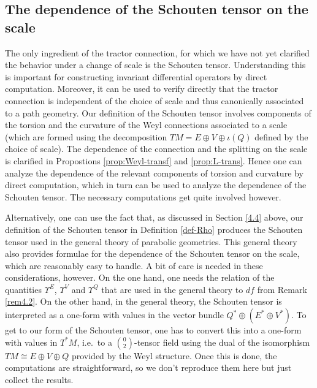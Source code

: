 \documentclass[11pt]{amsart}
\numberwithin{proposition}{section}
\numberwithin{equation}{section}
\begin{document}
\subsection{The dependence of the Schouten tensor on the scale}\label{4.6}
The only ingredient of the tractor connection, for which we have not yet clarified the behavior under a change of scale is the Schouten tensor. Understanding this is important for constructing invariant differential operators by direct computation. Moreover, it can be used to verify directly that the tractor connection is independent of the choice of scale and thus canonically associated to a path geometry. Our definition of the Schouten tensor involves components of the torsion and the curvature of the Weyl connections associated to a scale (which are formed using the decomposition $TM=E\oplus V\oplus\iota(Q)$ defined by the choice of scale). The dependence of the connection and the splitting on the scale is clarified in Propostions \ref{prop:Weyl-transf} and \ref{prop:L-trans}. Hence one can analyze the dependence of the relevant components of torsion and curvature by direct computation, which in turn can be used to analyze the dependence of the Schouten tensor. The necessary computations get quite involved however. 

Alternatively, one can use the fact that, as discussed in Section \ref{4.4} above, our definition of the Schouten tensor in Definition \ref{def-Rho} produces the Schouten tensor used in the general theory of parabolic geometries. This general theory also provides formulae for the dependence of the Schouten tensor on the scale, which are reasonably easy to handle. A bit of care is needed in these considerations, however. On the one hand, one needs the relation of the quantities $\Upsilon^E$, $\Upsilon^V$ and $\Upsilon^Q$ that are used in the general theory to $df$ from Remark \ref{rem4.2}. On the other hand, in the general theory, the Schouten tensor is interpreted as a one-form with values in the vector bundle $Q^*\oplus (E^*\oplus V^*)$. To get to our form of the Schouten tensor, one has to convert this into a one-form with values in $T^*M$, i.e.\ to a $\binom{0}{2}$-tensor field using the dual of the isomorphism $TM\cong E\oplus V\oplus Q$ provided by the Weyl structure. Once this is done, the computations are straightforward, so we don't reproduce them here but just collect the results.  
\end{document}

